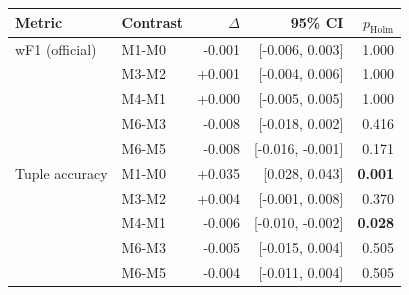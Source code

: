\begin{tabular}{llrrr}
\toprule
Metric & Contrast & $\Delta$ & 95\% CI & $p_{\mathrm{Holm}}$ \\
\midrule
wF1 (official) & M1-M0 & -0.001 & [-0.006, 0.003] & 1.000 \\
 & M3-M2 & +0.001 & [-0.004, 0.006] & 1.000 \\
 & M4-M1 & +0.000 & [-0.005, 0.005] & 1.000 \\
 & M6-M3 & -0.008 & [-0.018, 0.002] & 0.416 \\
 & M6-M5 & -0.008 & [-0.016, -0.001] & 0.171 \\
\midrule
Tuple accuracy & M1-M0 & +0.035 & [0.028, 0.043] & \textbf{0.001} \\
 & M3-M2 & +0.004 & [-0.001, 0.008] & 0.370 \\
 & M4-M1 & -0.006 & [-0.010, -0.002] & \textbf{0.028} \\
 & M6-M3 & -0.005 & [-0.015, 0.004] & 0.505 \\
 & M6-M5 & -0.004 & [-0.011, 0.004] & 0.505 \\
\bottomrule
\end{tabular}
